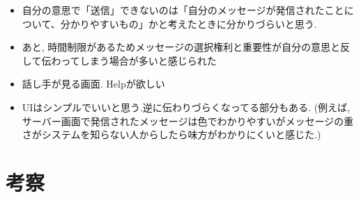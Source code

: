 \documentclass{funthesis}
\begin{document}
\begin{itemize}
 \item 自分の意思で「送信」できないのは「自分のメッセージが発信されたことについて、分かりやすいもの」かと考えたときに分かりづらいと思う.\\
 \item あと,  時間制限があるためメッセージの選択権利と重要性が自分の意思と反して伝わってしまう場合が多いと感じられた\\
 \item 話し手が見る画面. Helpが欲しい\\
 \item UIはシンプルでいいと思う.逆に伝わりづらくなってる部分もある. (例えば, サーバー画面で発信されたメッセージは色でわかりやすいがメッセージの重さがシステムを知らない人からしたら味方がわかりにくいと感じた.)\\
\end{itemize}










\chapter{考察}
\end{document}
